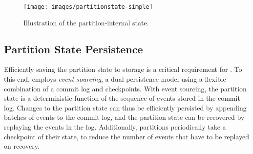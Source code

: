 
\begin{figure}
    \centering
    \texttt{[image: images/partitionstate-simple]}
    \caption{Illustration of the partition-internal state.}
    \label{fig:partitionstate}
\end{figure}

\subsection{Partition State Persistence}\label{sec:espstate}

Efficiently saving the partition state to storage is a critical requirement for \sys. 
To this end, \sys employs \emph{event sourcing}, a dual persistence model using a flexible combination of a commit log and checkpoints. With event sourcing, the partition state is a deterministic function of the sequence of events stored in the commit log. Changes to the partition state can thus be efficiently persisted by appending batches of events to the commit log, and the partition state can be recovered by replaying the events in the log. Additionally, partitions periodically take a checkpoint of their state, to reduce the number of events that have to be replayed on recovery.

